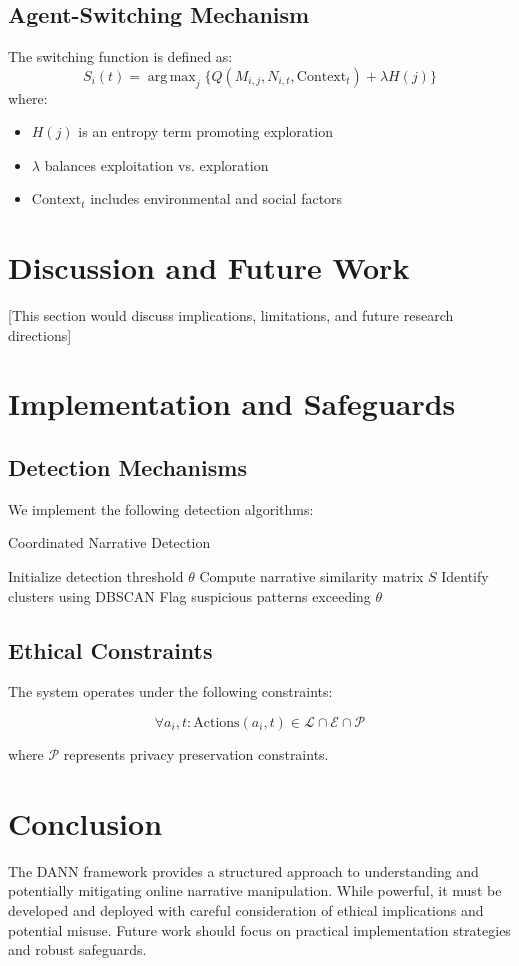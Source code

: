 \documentclass{article}
\DeclareMathOperator*{\argmax}{arg\,max}
\begin{document}
\subsection{Agent-Switching Mechanism}
The switching function is defined as:
\begin{equation}
    S_i(t) = \argmax_{j} \{Q(M_{i,j}, N_{i,t}, \text{Context}_t) + \lambda H(j)\}
\end{equation}
where:
\begin{itemize}
    \item $H(j)$ is an entropy term promoting exploration
    \item $\lambda$ balances exploitation vs. exploration
    \item $\text{Context}_t$ includes environmental and social factors
\end{itemize}

\section{Discussion and Future Work}
[This section would discuss implications, limitations, and future research directions]

\section{Implementation and Safeguards}
\subsection{Detection Mechanisms}
We implement the following detection algorithms:
\begin{algorithm}[H]
\caption{Coordinated Narrative Detection}
\begin{algorithmic}[1]
\State Initialize detection threshold $\theta$
    \State Compute narrative similarity matrix $S$
    \State Identify clusters using DBSCAN
    \State Flag suspicious patterns exceeding $\theta$
\EndFor
\end{algorithmic}
\end{algorithm}

\subsection{Ethical Constraints}
The system operates under the following constraints:

\begin{equation}
\forall a_i, t: \text{Actions}(a_i, t) \in \mathcal{L} \cap \mathcal{E} \cap \mathcal{P}
\end{equation}

where $\mathcal{P}$ represents privacy preservation constraints.

\section{Conclusion}
The DANN framework provides a structured approach to understanding and potentially mitigating online narrative manipulation. While powerful, it must be developed and deployed with careful consideration of ethical implications and potential misuse. Future work should focus on practical implementation strategies and robust safeguards.
\end{document}
